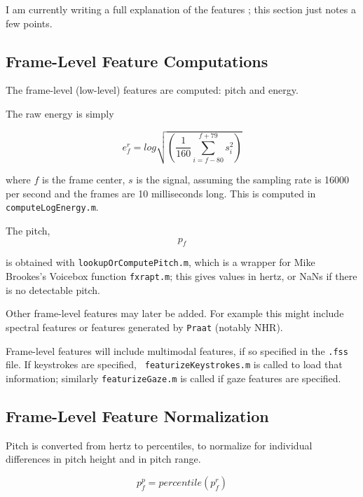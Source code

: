 \documentclass[11pt]{article}
\begin{document}
I am currently writing a full explanation of the features
\cite{mid-level-features}; this section just notes a few points. 

\subsection{Frame-Level Feature Computations}

The frame-level (low-level) features are computed: pitch and energy.

The raw energy is simply

\begin{equation}
e_f^r = log \sqrt{(\frac{1}{160} \sum\limits_{i=f-80}^{f+79} s_i^2)}
\end{equation}

where $f$ is the frame center, $s$ is the signal, assuming the
sampling rate is 16000 per second and the frames are 10 milliseconds
long.  This is computed in {\tt computeLogEnergy.m}.

The  pitch,
\begin{equation}
   p_f
\end{equation}


is obtained with {\tt lookupOrComputePitch.m}, which is a wrapper for
Mike Brookes's Voicebox function {\tt fxrapt.m}; this gives values in
hertz, or NaNs if there is no detectable pitch.

Other frame-level features may later be added.  For example this might
include spectral features or features generated by {\tt Praat}
(notably NHR).

Frame-level features will include multimodal features, if so specified
in the {\tt .fss} file.  If keystrokes are specified, {\tt
  featurizeKeystrokes.m} is called to load that information; similarly
{\tt featurizeGaze.m} is called if gaze features are specified.

\subsection{Frame-Level Feature  Normalization}

Pitch is converted from hertz to percentiles, to normalize for
individual differences in pitch height and in pitch range.

\begin{equation}
p_f^p = percentile(p_f^r)
\end{equation}
\end{document}
